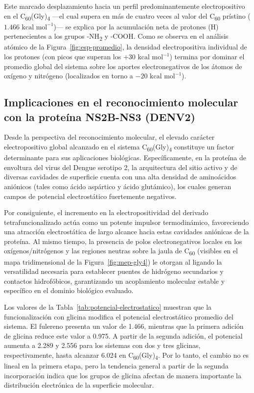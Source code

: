 Este marcado desplazamiento hacia un perfil predominantemente electropositivo en el C\textsubscript{60}(Gly)\textsubscript{4} —el cual supera en más de cuatro veces al valor del C\textsubscript{60} prístino ($1.466\text{ kcal mol}^{-1}$)— se explica por la acumulación neta de protones (H) pertenecientes a los grupos -NH\textsubscript{2} y -COOH. Como se observa en el análisis atómico de la Figura~\ref{fig:esp-promedio}, la densidad electropositiva individual de los protones (con picos que superan los $+30\text{ kcal mol}^{-1}$) termina por dominar el promedio global del sistema sobre los aportes electronegativos de los átomos de oxígeno y nitrógeno (localizados en torno a $-20\text{ kcal mol}^{-1}$).

\subsection{Implicaciones en el reconocimiento molecular con la proteína NS2B-NS3 (DENV2)}

Desde la perspectiva del reconocimiento molecular, el elevado carácter electropositivo global alcanzado en el sistema C\textsubscript{60}(Gly)\textsubscript{4} constituye un factor determinante para sus aplicaciones biológicas. Específicamente, en la proteína de envoltura del virus del Dengue serotipo 2, la arquitectura del sitio activo y de diversas cavidades de superficie cuenta con una alta densidad de aminoácidos aniónicos (tales como ácido aspártico y ácido glutámico), los cuales generan campos de potencial electrostático fuertemente negativos.

Por consiguiente, el incremento en la electropositividad del derivado tetrafuncionalizado actúa como un potente impulsor termodinámico, favoreciendo una atracción electrostática de largo alcance hacia estas cavidades aniónicas de la proteína. Al mismo tiempo, la presencia de polos electronegativos locales en los oxígenos/nitrógenos y las regiones neutras sobre la jaula de C\textsubscript{60} (visibles en el mapa tridimensional de la Figura~\ref{fig:mep-gly4}) le otorgan al ligando la versatilidad necesaria para establecer puentes de hidrógeno secundarios y contactos hidrofóbicos, garantizando un acoplamiento molecular estable y específico en el dominio biológico evaluado.


Los valores de la Tabla~\ref{tab:potencial-electrostatico} muestran que la funcionalización con glicina modifica el potencial electrostático promedio del sistema. El fulereno presenta un valor de 1.466, mientras que la primera adición de glicina reduce este valor a 0.975. A partir de la segunda adición, el potencial aumenta a 2.289 y 2.556 para los sistemas con dos y tres glicinas, respectivamente, hasta alcanzar 6.024 en C\textsubscript{60}(Gly)\textsubscript{4}. Por lo tanto, el cambio no es lineal en la primera etapa, pero la tendencia general a partir de la segunda incorporación indica que los grupos de glicina afectan de manera importante la distribución electrónica de la superficie molecular.


